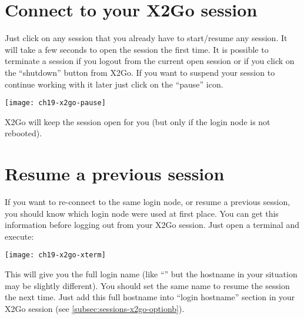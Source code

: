 \section{Connect to your X2Go session}
\label{sec:connect-x2go}
Just click on any session that you already have to start/resume any session. It will take a few seconds to open the session the first time.
It is possible to terminate a session if you logout from the current open session or if you click on the ``shutdown'' button from X2Go.
If you want to suspend your session to continue working with it later just click on the ``pause'' icon.

\begin{center}
  \texttt{[image: ch19-x2go-pause]}
\end{center}

X2Go will keep the session open for you (but only if the login node is not rebooted).

\section{Resume a previous session}
\label{sec:re-connect-x2go}

If you want to re-connect to the same login node, or resume a previous session, you should know which login node were used at first place.
You can get this information before logging out from your X2Go session. Just open a terminal and execute: 

\begin{prompt}
\end{prompt}

\texttt{[image: ch19-x2go-xterm]}

This will give you the full login name (like ``\strong{\emph{\loginhost{}}}'' but the hostname in your situation may be slightly different).
You should set the same name to resume the  session the next time.
Just add this full hostname into ``login hostname'' section in your X2Go session (see \autoref{subsec:sessions-x2go-optionb}).
